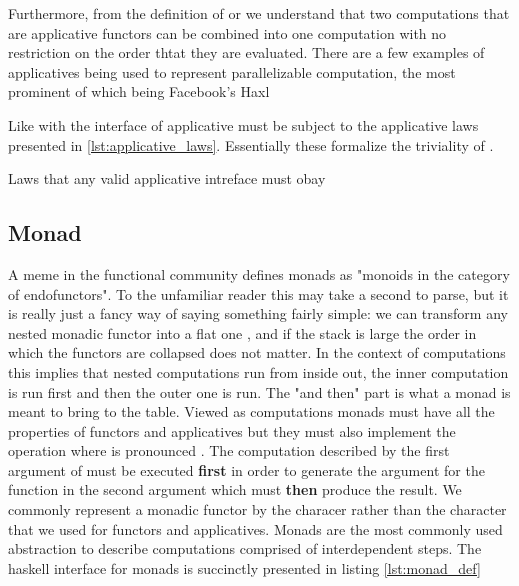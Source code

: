 Furthermore, from the definition of  or \hask{<*>} we
understand that two computations that are applicative functors can be
combined into one computation with no restriction on the order thtat
they are evaluated. There are a few examples of applicatives being
used to represent parallelizable computation, the most prominent of
which being Facebook's Haxl \cite{marlowHaxlProjectFacebook2013}

Like with  the interface of applicative must be subject
to the applicative laws presented in
\ref{lst:applicative_laws}. Essentially these formalize the triviality
of .

\begin{code}
\label{lst:applicative_laws}
\caption{Laws that any valid applicative intreface must obay}
\end{code}

\subsection{Monad}

A meme in the functional community defines monads as "monoids in the
category of endofunctors". To the unfamiliar reader this may take a
second to parse, but it is really just a fancy way of saying something
fairly simple: we can transform any nested monadic functor  into a flat one , and if the stack is large  the order in which the functors are collapsed does
not matter. In the context of computations this implies that nested
computations run from inside out, the inner computation is run first
and then the outer one is run. The "and then" part is what a monad is
meant to bring to the table. Viewed as computations monads must have
all the properties of functors and applicatives but they must also
implement the operation  where
\hask{>>=} is pronounced . The computation described by the
first argument of \hask{>>=} must be executed \textbf{first} in order
to generate the argument for the function in the second argument which
must \textbf{then} produce the result. We commonly represent a monadic
functor by the characer  rather than the character 
that we used for functors and applicatives. Monads are the most
commonly used abstraction to describe computations comprised of
interdependent steps. The haskell interface for monads is succinctly
presented in listing \ref{lst:monad_def}

